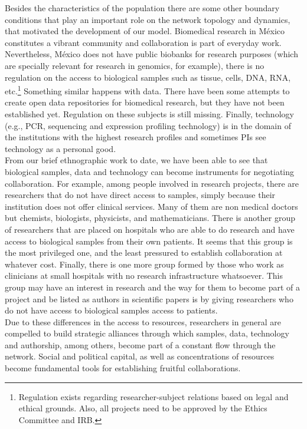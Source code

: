 \documentclass[11pt]{article}
\begin{document}
Besides the characteristics of the population there are some other boundary
conditions that play an important role on the network topology and dynamics,
that motivated the development of our model. Biomedical research in M\'exico
constitutes a vibrant community and collaboration is part of everyday
work. Nevertheless, M\'exico does not have public biobanks for research purposes
(which are specially relevant for research in genomics, for example), there is
no regulation on the access to biological samples such as tissue, cells, DNA,
RNA, etc.\footnote{Regulation exists regarding researcher-subject relations
  based on legal and ethical grounds. Also, all projects need to be approved by
  the Ethics Committee and IRB.} Something similar happens with data. There have
been some attempts to create open data repositories for biomedical research, but
they have not been established yet. Regulation on these subjects is still
missing. Finally, technology (e.g., PCR, sequencing and expression profiling
technology) is in the domain of the institutions with the highest research
profiles and sometimes PIs see technology as a personal good.\\  

From our brief ethnographic work to date, we have been able to see that
biological samples, data and technology can become instruments for negotiating
collaboration. For example, among people involved in research projects, there
are researchers that do not have direct access to samples, simply because their
institution does not offer clinical services. Many of them are non medical
doctors but chemists, biologists, physicists, and mathematicians. There is
another group of researchers that are placed on hospitals who are able to do
research and have access to biological samples from their own patients. It seems
that this group is the most privileged one, and the least pressured to establish
collaboration at whatever cost. Finally, there is one more group formed by those
who work as clinicians at small hospitals with no research infrastructure
whatsoever. This group may have an interest in research and the way for them to
become part of a project and be listed as authors in scientific papers is by
giving researchers who do not have access to biological samples access to
patients.\\

Due to these differences in the access to resources, researchers in
general are compelled to build strategic alliances through which samples, data,
technology and authorship, among others, become part of a constant flow through
the network. Social and political capital, as well as concentrations of
resources become fundamental tools for establishing fruitful collaborations. 
\end{document}
